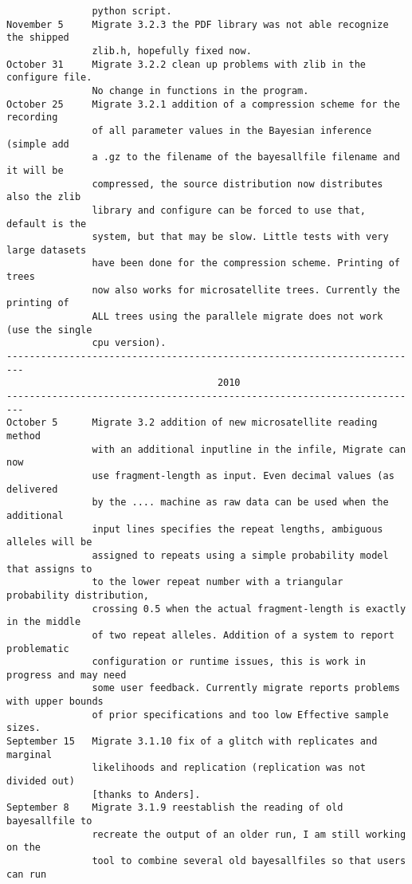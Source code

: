 \begin{small}
\begin{verbatim}
               python script.
November 5     Migrate 3.2.3 the PDF library was not able recognize the shipped
               zlib.h, hopefully fixed now.
October 31     Migrate 3.2.2 clean up problems with zlib in the configure file.
               No change in functions in the program.
October 25     Migrate 3.2.1 addition of a compression scheme for the recording
               of all parameter values in the Bayesian inference (simple add
               a .gz to the filename of the bayesallfile filename and it will be
               compressed, the source distribution now distributes also the zlib
               library and configure can be forced to use that, default is the
               system, but that may be slow. Little tests with very large datasets
               have been done for the compression scheme. Printing of trees 
               now also works for microsatellite trees. Currently the printing of 
               ALL trees using the parallele migrate does not work (use the single
               cpu version).
-------------------------------------------------------------------------
                                     2010
-------------------------------------------------------------------------
October 5      Migrate 3.2 addition of new microsatellite reading method
               with an additional inputline in the infile, Migrate can now
               use fragment-length as input. Even decimal values (as delivered
               by the .... machine as raw data can be used when the additional
               input lines specifies the repeat lengths, ambiguous alleles will be 
               assigned to repeats using a simple probability model that assigns to
               to the lower repeat number with a triangular probability distribution, 
               crossing 0.5 when the actual fragment-length is exactly in the middle 
               of two repeat alleles. Addition of a system to report problematic 
               configuration or runtime issues, this is work in progress and may need 
               some user feedback. Currently migrate reports problems with upper bounds
               of prior specifications and too low Effective sample sizes.   
September 15   Migrate 3.1.10 fix of a glitch with replicates and marginal
               likelihoods and replication (replication was not divided out)
               [thanks to Anders].
September 8    Migrate 3.1.9 reestablish the reading of old bayesallfile to
               recreate the output of an older run, I am still working on the 
               tool to combine several old bayesallfiles so that users can run

\end{verbatim}
\end{small}
